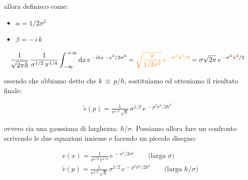 	allora definisco come:
	
\begin{itemize}
	\item $\alpha = 1/2\sigma^2$
	\item $\beta = - \,i \,k$
\end{itemize}
	
\begin{align*}
	\frac{1}{\sqrt{2\pi\hbar}}  \, \frac{1}{\sigma^{1/2} \, \pi^{1/4}}\int_{-\infty}^{\, + \infty} \dd x \, e^{\, - ikx \, - x^2 / 2\sigma^2} = \textcolor{orange}{ \sqrt{\frac{\pi}{1/2\sigma^2}} \, e^{\, - \sigma^2 \, k^2/2   }} = \sigma \sqrt{2\pi} \,  e^{\, - \sigma^2 \, \textcolor{red}{k}^2/2}
\end{align*}

	essendo che abbiamo detto che $k \, \equiv \, p/\hbar$, sostituiamo ed otteniamo il risultato finale:
	
\begin{align*}
	\tilde{v}(p) = \frac{1}{\pi^{1/4} \, \sqrt{\hbar}} \, \sigma^{1/2} \, e^{\, - p^2 \sigma^2/2\hbar^{2}}
\end{align*}
	
	ovvero sia una gaussiana di larghezza: $\hbar/\sigma$. Possiamo allora fare un confronto scrivendo le due equazioni insieme e facendo un piccolo disegno:
	
\begin{mydef}
\begin{align*}
	& v(x) = \frac{1}{\sigma^{1/2} \, \pi^{1/4}} \, e^{\, - x^2 / 2\sigma^2} \qquad \text{(larga $\sigma$)} \\
	& \tilde{v}(p) = \frac{1}{\pi^{1/4} \, \sqrt{\hbar}} \, \sigma^{1/2} \, e^{\, - p^2 \sigma^2/2\hbar^{2}} \qquad \text{(larga $\hbar/\sigma$)}
\end{align*}
\end{mydef}

\vspace{1em}


